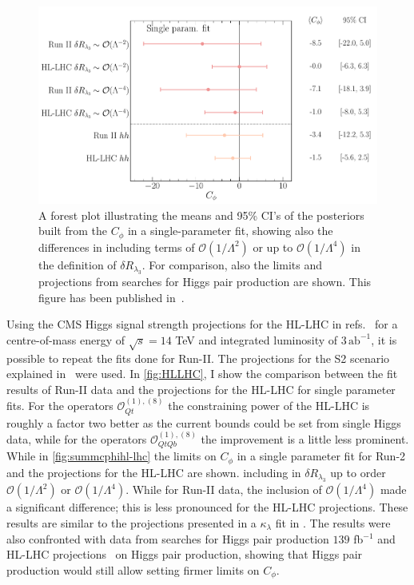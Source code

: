 	\begin{figure}
		\begin{center}
			\includegraphics[width=0.75\linewidth]{fig/uebeblick_forest_cphi_singleparam}
		\end{center}
		\caption{A forest plot illustrating the means and 95\% CI's of the posteriors built from the  $C_\phi$  in a single-parameter fit, showing also the differences in including terms of $\mathcal{O}(1/\Lambda^2)$ or up to $\mathcal{O}(1/\Lambda^4)$ in the definition of $\delta R_{\lambda_3}$. For comparison, also the limits and projections from searches for Higgs pair production are shown. This figure has been published in~\cite{Alasfar:2022zyr}.  \label{fig:summcphihl-lhc}  }
	\end{figure}
	Using the CMS Higgs signal strength projections for the HL-LHC in refs.~\cite{CMS-PAS-FTR-18-011,twiki} for a centre-of-mass energy of $\sqrt{s}=14$ TeV and integrated luminosity of $ 3\, \mathrm{ab}^{-1}$, it is possible to repeat the fits done for Run-II.   The projections for the S2 scenario explained in~\cite{Cepeda:2019klc} were used. 
	In \autoref{fig:HLLHC}, I show the comparison between the fit results of Run-II data and the projections for the HL-LHC for single parameter fits. For the operators $\mathcal{O}_{Qt}^{(1),(8)}$ the constraining power of the HL-LHC is roughly a factor two better as the current bounds could be set from single Higgs data, while for the operators $\mathcal{O}_{QtQb}^{(1),(8)}$ the improvement is a little less prominent.
	While in \autoref{fig:summcphihl-lhc}  the limits on $C_{\phi}$ in a single parameter fit for Run-2 and the projections for the HL-LHC are shown.
	including in $\delta R_{\lambda_3}$ up to order $\mathcal{O}(1/\Lambda^2)$ or $\mathcal{O}(1/\Lambda^4)$. While for Run-II data, the inclusion of $\mathcal{O}(1/\Lambda^4)$ made a significant difference; this is less pronounced for the HL-LHC projections. These results are similar to the projections presented in a $\kappa_{\lambda}$ fit in \cite{DiMicco:2019ngk}. 
	The results were also confronted with data from searches for Higgs pair production $139$ fb$^{-1}$ \cite{ATLAS:2021jki}  and HL-LHC projections~\cite{CMS:2018ccd} on Higgs pair production, showing that Higgs pair production would still allow setting firmer limits on $C_{\phi}$. 
